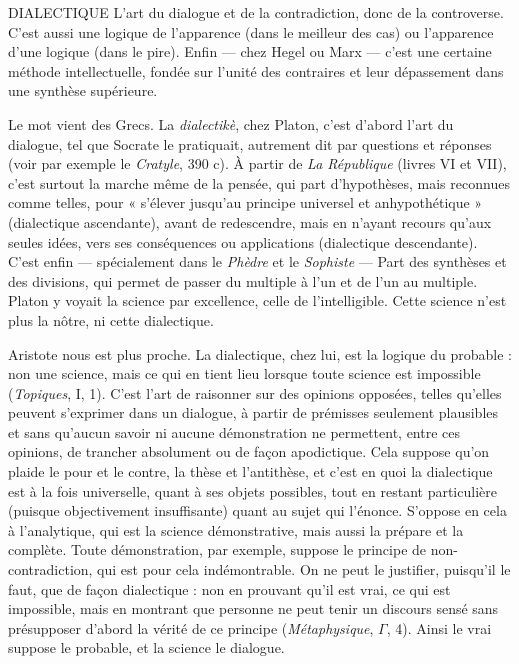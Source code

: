 DIALECTIQUE L’art du dialogue et de la contradiction, donc de la controverse.
C’est aussi une logique de l’apparence (dans le
meilleur des cas) ou l’apparence d’une logique (dans le pire). Enfin — chez
Hegel ou Marx — c’est une certaine méthode intellectuelle, fondée sur l'unité
des contraires et leur dépassement dans une synthèse supérieure.

Le mot vient des Grecs. La {\it dialectikè}, chez Platon, c’est d’abord l’art du dialogue,
tel que Socrate le pratiquait, autrement dit par questions et réponses
(voir par exemple le {\it Cratyle}, 390 c). À partir de {\it La République} (livres VI
et VII), c’est surtout la marche même de la pensée, qui part d’hypothèses,
mais reconnues comme telles, pour « s'élever jusqu’au principe universel et
anhypothétique » (dialectique ascendante), avant de redescendre, mais en
n'ayant recours qu'aux seules idées, vers ses conséquences ou applications (dialectique
descendante). C’est enfin — spécialement dans le {\it Phèdre} et le {\it Sophiste} —
Part des synthèses et des divisions, qui permet de passer du multiple à l’un et
de l’un au multiple. Platon y voyait la science par excellence, celle de l’intelligible.
Cette science n’est plus la nôtre, ni cette dialectique.

Aristote nous est plus proche. La dialectique, chez lui, est la logique du
probable : non une science, mais ce qui en tient lieu lorsque toute science est
impossible ({\it Topiques}, I, 1). C’est l’art de raisonner sur des opinions opposées,
telles qu’elles peuvent s'exprimer dans un dialogue, à partir de prémisses seulement
plausibles et sans qu’aucun savoir ni aucune démonstration ne permettent,
entre ces opinions, de trancher absolument ou de façon apodictique. Cela
suppose qu’on plaide le pour et le contre, la thèse et l’antithèse, et c’est en quoi
la dialectique est à la fois universelle, quant à ses objets possibles, tout en restant
particulière (puisque objectivement insuffisante) quant au sujet qui
l’énonce. S’oppose en cela à l’analytique, qui est la science démonstrative, mais
aussi la prépare et la complète. Toute démonstration, par exemple, suppose le
principe de non-contradiction, qui est pour cela indémontrable. On ne peut le
justifier, puisqu'il le faut, que de façon dialectique : non en prouvant qu’il est
vrai, ce qui est impossible, mais en montrant que personne ne peut tenir un
discours sensé sans présupposer d’abord la vérité de ce principe ({\it Métaphysique},
$\Gamma$, 4). Ainsi le vrai suppose le probable, et la science le dialogue.

